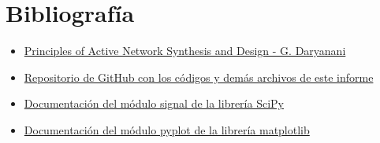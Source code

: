\documentclass[12pt,a4paper]{article}
\begin{document}
\section{Bibliografía}
\begin{itemize}
    \item \href{https://fcefyn.aulavirtual.unc.edu.ar/pluginfile.php/960585/mod_folder/content/0/%5BGobind_Daryanani%5D_Principles_of_Active_Network_Sy%28z-lib.org%29.pdf?forcedownload=1}{Principles of Active Network Synthesis and Design - G. Daryanani}
    \item \href{https://github.com/ErnestMonja/Sintesis_de_Redes_Activas/tree/main}{Repositorio de GitHub con los códigos y demás archivos de este informe}
    \item \href{https://docs.scipy.org/doc/scipy/tutorial/signal.html#filtering}{Documentación del módulo signal de la librería SciPy}
    \item \href{https://matplotlib.org/3.5.3/api/_as_gen/matplotlib.pyplot.html}{Documentación del módulo pyplot de la librería matplotlib} 
\end{itemize}
\end{document}
